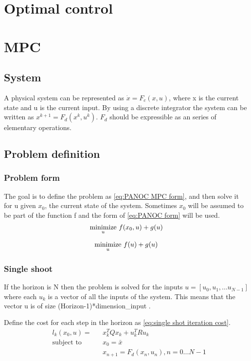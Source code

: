 \section{Optimal control}

\section{MPC}
	\subsection{System}
		A physical system can be represented as $\dot{x}=F_c(x,u)$, where x is the current state and u is the current input. By using a discrete integrator the system can be written as $x^{k+1}=F_d(x^{k},u^{k})$. $F_d$ should be expressible as an series of elementary operations.
	\subsection{Problem definition}
		\subsubsection{Problem form}
			The goal is to define the problem as \eqref{eq:PANOC MPC form}, and then solve it for u given $x_0$, the current state of the system. Sometimes $x_0$ will be assumed to be part of the function f and the form of \eqref{eq:PANOC form} will be used.
			\begin{equation}
				\underset{u}{\operatorname*{minimize}} \  f(x_0,u) + g(u)
				\label{eq:PANOC MPC form}
			\end{equation}
			
			\begin{equation}
				\underset{u}{\operatorname*{minimize}} \  f(u) + g(u)
				\label{eq:PANOC form}
			\end{equation}
		\subsubsection{Single shoot}
			If the horizon is N then the problem is solved for the inputs $u=[u_0,u_1,... u_{N-1}]$ where each $u_k$ is a vector of all the inputs of the system. This means that the vector u is of size (Horizon-1)*dimension\_input .
			
			Define the cost for each step in the horizon as \eqref{eq:single shot iteration cost}.
			\begin{equation}
				\begin{aligned}
				& l_k(x_0,u) = &&  x_k^T Q x_k  +  u_k^T R u_k \\
				& \text{subject to}			&& x_0 = \bar{x} \\
				& 							&&  x_{n+1} = F_d(x_n,u_n), n=0...N-1
				\end{aligned}
				\label{eq:single shot iteration cost}
			\end{equation}
			
